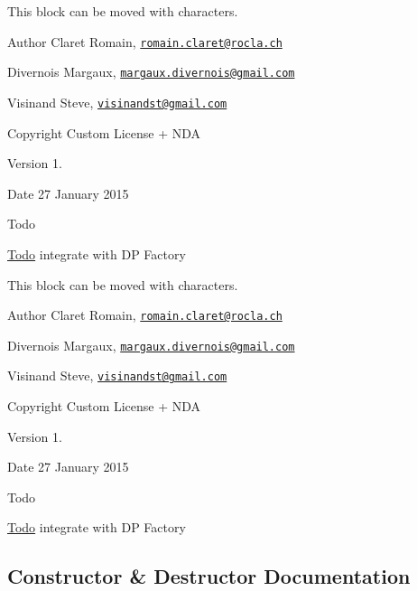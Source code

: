This block can be moved with characters. \begin{DoxyAuthor}{Author}
Claret Romain, \href{mailto:romain.claret@rocla.ch}{\tt romain.\+claret@rocla.\+ch} 

Divernois Margaux, \href{mailto:margaux.divernois@gmail.com}{\tt margaux.\+divernois@gmail.\+com} 

Visinand Steve, \href{mailto:visinandst@gmail.com}{\tt visinandst@gmail.\+com} 
\end{DoxyAuthor}
\begin{DoxyCopyright}{Copyright}
Custom License + N\+D\+A 
\end{DoxyCopyright}
\begin{DoxyVersion}{Version}
1. 
\end{DoxyVersion}
\begin{DoxyDate}{Date}
27 January 2015 
\end{DoxyDate}
\begin{DoxyRefDesc}{Todo}
\item[\hyperlink{todo__todo000001}{Todo}]integrate with D\+P Factory \end{DoxyRefDesc}


This block can be moved with characters. \begin{DoxyAuthor}{Author}
Claret Romain, \href{mailto:romain.claret@rocla.ch}{\tt romain.\+claret@rocla.\+ch} 

Divernois Margaux, \href{mailto:margaux.divernois@gmail.com}{\tt margaux.\+divernois@gmail.\+com} 

Visinand Steve, \href{mailto:visinandst@gmail.com}{\tt visinandst@gmail.\+com} 
\end{DoxyAuthor}
\begin{DoxyCopyright}{Copyright}
Custom License + N\+D\+A 
\end{DoxyCopyright}
\begin{DoxyVersion}{Version}
1. 
\end{DoxyVersion}
\begin{DoxyDate}{Date}
27 January 2015 
\end{DoxyDate}
\begin{DoxyRefDesc}{Todo}
\item[\hyperlink{todo__todo000007}{Todo}]integrate with D\+P Factory \end{DoxyRefDesc}


\subsection{Constructor \& Destructor Documentation}
\hypertarget{class_b___movable_ac874fc12d19502117d0bfc396d1059d2}{}
